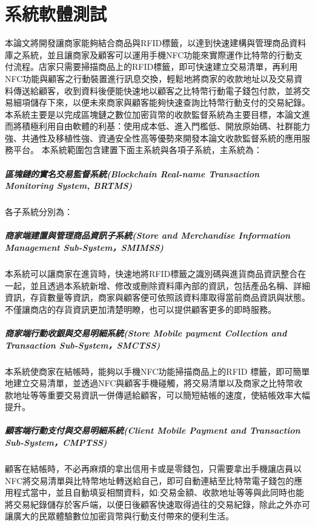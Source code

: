 
\chapter{系統軟體測試}

本論文將開發讓商家能夠結合商品與RFID標籤，以達到快速建構與管理商品資料庫之系統，並且讓商家及顧客可以運用手機NFC功能來實際運作比特幣的行動支付流程。店家只需要掃描商品上的RFID標籤，即可快速建立交易清單，再利用NFC功能與顧客之行動裝置進行訊息交換，輕鬆地將商家的收款地址以及交易資料傳送給顧客，收到資料後便能快速地以顧客之比特幣行動電子錢包付款，並將交易細項儲存下來，以便未來商家與顧客能夠快速查詢比特幣行動支付的交易紀錄。
本系統主要是以完成區塊鏈之數位加密貨幣的收款監督系統為主要目標，本論文進而將積極利用自由軟體的利基：使用成本低、進入門檻低、開放原始碼、社群能力強、共通性及移植性強、資通安全性高等優勢來開發本論文收款監督系統的應用服務平台。
本系統範圍包含建置下面主系統與各項子系統，主系統為：
		\paragraph{區塊鏈的實名交易監督系統(Blockchain Real-name Transaction Monitoring System, BRTMS)}

各子系統分別為：
 		\paragraph{商家端建置與管理商品資訊子系統(Store and Merchandise Information Management Sub-System，SMIMSS)}本系統可以讓商家在進貨時，快速地將RFID標籤之識別碼與進貨商品資訊整合在一起，並且透過本系統新增、修改或刪除資料庫內部的資訊，包括產品名稱、詳細資訊，存貨數量等資訊，商家與顧客便可依照該資料庫取得當前商品資訊與狀態。不僅讓商店的存貨資訊更加清楚明瞭，也可以提供顧客更多的即時服務。
 		\paragraph{商家端行動收銀與交易明細系統(Store Mobile payment Collection and Transaction Sub-System，SMCTSS)}本系統使商家在結帳時，能夠以手機NFC功能掃描商品上的RFID 標籤，即可簡單地建立交易清單，並透過NFC與顧客手機碰觸，將交易清單以及商家之比特幣收款地址等等重要交易資訊一併傳遞給顧客，可以簡短結帳的速度，使結帳效率大幅提升。 
 		\paragraph{顧客端行動支付與交易明細系統(Client Mobile Payment and Transaction Sub-System，CMPTSS)}顧客在結帳時，不必再麻煩的拿出信用卡或是零錢包，只需要拿出手機讓店員以NFC將交易清單與比特幣地址轉送給自己，即可自動連結至比特幣電子錢包的應用程式當中，並且自動填妥相關資料，如:交易金額、收款地址等等與此同時也能將交易紀錄儲存於客戶端，以便日後顧客快速取得過往的交易紀錄，除此之外亦可讓廣大的民眾體驗數位加密貨幣與行動支付帶來的便利生活。

